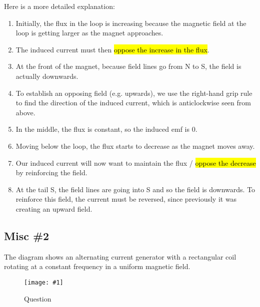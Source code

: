 \documentclass[a4paper,12pt]{article}
\newcommand{\img}[4]{\begin{center}
  \begin{figure}[H]
    \centering
    \texttt{[image: \#1]}
    \caption{#3}
    \label{fig:#4}
  \end{figure}
\end{center}}
\begin{document}
Here is a more detailed explanation:
\begin{enumerate}
  \item Initially, the flux in the loop is increasing because the magnetic field at the loop is getting larger as the magnet approaches.
  \item The induced current must then \hl{oppose the increase in the flux}.
  \item At the front of the magnet, because field lines go from N to S, the field is actually downwards.
  \item To establish an opposing field (e.g. upwards), we use the right-hand grip rule to find the direction of the induced current, which is anticlockwise seen from above.
  \item In the middle, the flux is constant, so the induced emf is 0.
  \item Moving below the loop, the flux starts to decrease as the magnet moves away.
  \item Our induced current will now want to maintain the flux / \hl{oppose the decrease} by reinforcing the field.
  \item At the tail S, the field lines are going into S and so the field is downwards. To reinforce this field, the current must be reversed, since previously it was creating an upward field.
\end{enumerate}

\pagebreak

\subsection{Misc \#2}

The diagram shows an alternating current generator with a rectangular coil rotating at a constant frequency in a uniform magnetic field.

\img{ex/14.png}{0.75}{Question}{acgen}
\end{document}
